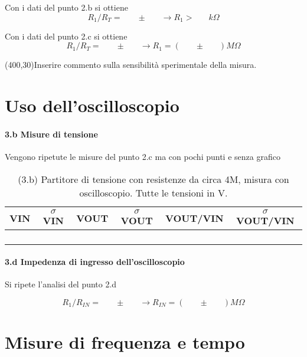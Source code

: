 \documentclass[10pt,a4paper]{article}
\newcommand{\exn}{\phantom{xxx}}
\begin{document}
Con i dati del punto 2.b si ottiene
\[ R_1/R_T = \exn  \pm  \exn   \rightarrow  R_1 > \exn k\Omega
\]


Con i dati del punto 2.c si ottiene
\[ R_1/R_T = \exn  \pm  \exn   \rightarrow  R_1 = (\exn \pm  \exn)  M\Omega
\]


\framebox(400,30){Inserire commento sulla sensibilit\`a sperimentale della misura.} 


\section{Uso dell'oscilloscopio}

\paragraph{3.b Misure di tensione} 
Vengono ripetute le misure del punto 2.c  ma con pochi punti e senza grafico
\begin{table}[h]
\centering
\begin{tabular}{|c|c|c|c|c|c|}
\hline 
VIN& $\sigma$ VIN  &VOUT	 & $\sigma$ VOUT& VOUT/VIN & $\sigma$ VOUT/VIN \\
\hline 
\exn & \exn & \exn & \exn & \exn &\exn \\
\exn & \exn & \exn & \exn & \exn &\exn \\
\exn & \exn & \exn & \exn & \exn &\exn \\
\exn & \exn & \exn & \exn & \exn &\exn \\
\hline 
\end{tabular} 
\caption{(3.b) Partitore di tensione con resistenze da circa 4M, misura con oscilloscopio. Tutte le tensioni in V.}
\end{table}


\paragraph{3.d Impedenza di ingresso dell'oscilloscopio} Si ripete l'analisi del punto 2.d

\[ R_1/R_{IN} = \exn  \pm  \exn   \rightarrow  R_{IN} = (\exn \pm  \exn)  M\Omega
\]


\section{Misure di frequenza e tempo}
\end{document}

